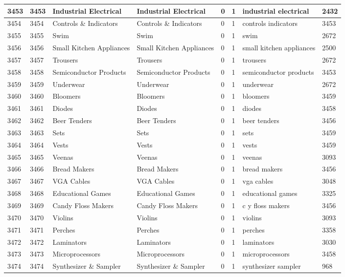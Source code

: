 \begin{longtable}{|l|l|l|l|l|l|l|l|}
3453 & 3453 & Industrial Electrical & Industrial Electrical & 0 & 1 & industrial electrical & 2432 \\ \hline 
3454 & 3454 & Controls \& Indicators & Controls \& Indicators & 0 & 1 & controls indicators & 3453 \\ \hline 
3455 & 3455 & Swim & Swim & 0 & 1 & swim & 2672 \\ \hline 
3456 & 3456 & Small Kitchen Appliances & Small Kitchen Appliances & 0 & 1 & small kitchen appliances & 2500 \\ \hline 
3457 & 3457 & Trousers & Trousers & 0 & 1 & trousers & 2672 \\ \hline 
3458 & 3458 & Semiconductor Products & Semiconductor Products & 0 & 1 & semiconductor products & 3453 \\ \hline 
3459 & 3459 & Underwear & Underwear & 0 & 1 & underwear & 2672 \\ \hline 
3460 & 3460 & Bloomers & Bloomers & 0 & 1 & bloomers & 3459 \\ \hline 
3461 & 3461 & Diodes & Diodes & 0 & 1 & diodes & 3458 \\ \hline 
3462 & 3462 & Beer Tenders & Beer Tenders & 0 & 1 & beer tenders & 3456 \\ \hline 
3463 & 3463 & Sets & Sets & 0 & 1 & sets & 3459 \\ \hline 
3464 & 3464 & Vests & Vests & 0 & 1 & vests & 3459 \\ \hline 
3465 & 3465 & Veenas & Veenas & 0 & 1 & veenas & 3093 \\ \hline 
3466 & 3466 & Bread Makers & Bread Makers & 0 & 1 & bread makers & 3456 \\ \hline 
3467 & 3467 & VGA Cables & VGA Cables & 0 & 1 & vga cables & 3048 \\ \hline 
3468 & 3468 & Educational Games & Educational Games & 0 & 1 & educational games & 3325 \\ \hline 
3469 & 3469 & Candy Floss Makers & Candy Floss Makers & 0 & 1 & c y floss makers & 3456 \\ \hline 
3470 & 3470 & Violins & Violins & 0 & 1 & violins & 3093 \\ \hline 
3471 & 3471 & Perches & Perches & 0 & 1 & perches & 3358 \\ \hline 
3472 & 3472 & Laminators & Laminators & 0 & 1 & laminators & 3030 \\ \hline 
3473 & 3473 & Microprocessors & Microprocessors & 0 & 1 & microprocessors & 3458 \\ \hline 
3474 & 3474 & Synthesizer \& Sampler & Synthesizer \& Sampler & 0 & 1 & synthesizer sampler & 968 \\ \hline 

\end{longtable}
